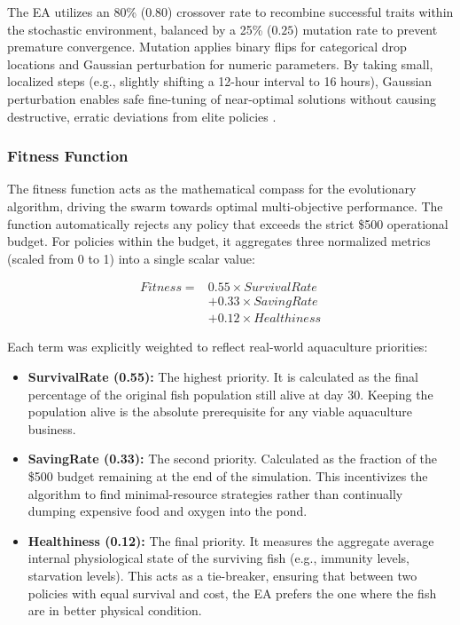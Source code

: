 \documentclass[conference]{IEEEtran}
\begin{document}
The EA utilizes an 80\% ($0.80$) crossover rate to recombine successful traits within the stochastic environment, balanced by a 25\% ($0.25$) mutation rate to prevent premature convergence. Mutation applies binary flips for categorical drop locations and Gaussian perturbation for numeric parameters. By taking small, localized steps (e.g., slightly shifting a 12-hour interval to 16 hours), Gaussian perturbation enables safe fine-tuning of near-optimal solutions without causing destructive, erratic deviations from elite policies \cite{hinterding1995}.

\subsubsection{Fitness Function}
The fitness function acts as the mathematical compass for the evolutionary algorithm, driving the swarm towards optimal multi-objective performance. The function automatically rejects any policy that exceeds the strict \$500 operational budget. For policies within the budget, it aggregates three normalized metrics (scaled from 0 to 1) into a single scalar value:

\begin{equation}
\boxed{
\begin{aligned}
Fitness ={} & 0.55 \times SurvivalRate \\
            & + 0.33 \times SavingRate \\
            & + 0.12 \times Healthiness
\end{aligned}
}
\end{equation}

Each term was explicitly weighted to reflect real-world aquaculture priorities:
\begin{itemize}
    \item \textbf{SurvivalRate (0.55):} The highest priority. It is calculated as the final percentage of the original fish population still alive at day 30. Keeping the population alive is the absolute prerequisite for any viable aquaculture business.
    \item \textbf{SavingRate (0.33):} The second priority. Calculated as the fraction of the \$500 budget remaining at the end of the simulation. This incentivizes the algorithm to find minimal-resource strategies rather than continually dumping expensive food and oxygen into the pond.
    \item \textbf{Healthiness (0.12):} The final priority. It measures the aggregate average internal physiological state of the surviving fish (e.g., immunity levels, starvation levels). This acts as a tie-breaker, ensuring that between two policies with equal survival and cost, the EA prefers the one where the fish are in better physical condition.
\end{itemize}
\end{document}
